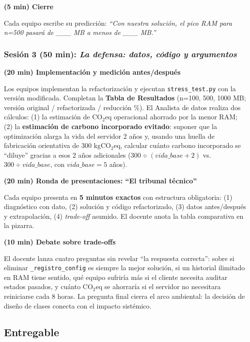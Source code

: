 \textbf{(5 min) Cierre}


Cada equipo escribe su predicción: \textit{``Con nuestra solución, el pico RAM para n=500 pasará de \_\_\_ MB a menos de \_\_\_ MB.''}




\subsubsection{Sesión 3 (50 min): \textit{La defensa: datos, código y argumentos}}


\textbf{(20 min) Implementación y medición antes/después}


Los equipos implementan la refactorización y ejecutan \texttt{stress\_test.py} con la versión modificada. Completan la \textbf{Tabla de Resultados} (n=100, 500, 1000 MB; versión original / refactorizada / reducción \%). El Analista de datos realiza dos cálculos: (1) la estimación de CO$_2$eq operacional ahorrado por la menor RAM; (2) la \textbf{estimación de carbono incorporado evitado}: suponer que la optimización alarga la vida del servidor 2 años y, usando una huella de fabricación orientativa de 300 kgCO$_2$eq, calcular cuánto carbono incorporado se ``diluye'' gracias a esos 2 años adicionales ($300 \div (vida\_base + 2)$ vs.\ $300 \div vida\_base$, con $vida\_base = 5$ años).


\textbf{(20 min) Ronda de presentaciones: ``El tribunal técnico''}


Cada equipo presenta en \textbf{5 minutos exactos} con estructura obligatoria: (1) diagnóstico con dato, (2) solución y código refactorizado, (3) datos antes/después y extrapolación, (4) \textit{trade-off} asumido. El docente anota la tabla comparativa en la pizarra.


\textbf{(10 min) Debate sobre trade-offs}


El docente lanza cuatro preguntas sin revelar ``la respuesta correcta'': sobre si eliminar \texttt{\_registro\_config} es siempre la mejor solución, si un historial ilimitado en RAM tiene sentido, qué equipo sufriría más si el cliente necesita auditar estados pasados, y cuánto CO$_2$eq se ahorraría si el servidor no necesitara reiniciarse cada 8 horas. La pregunta final cierra el arco ambiental: la decisión de diseño de clases conecta con el impacto sistémico.




\subsection{Entregable}


